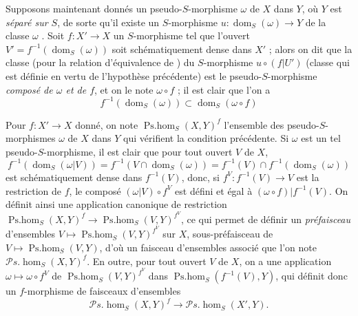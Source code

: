 \begin{env}[20.3.2]
Supposons maintenant donnés un pseudo-$S$-morphisme $\omega$ de $X$ dans $Y$, où $Y$ est \emph{séparé sur $S$}, de sorte qu'il existe un $S$-morphisme $u:\operatorname{dom}_S(\omega)\to Y$ de la classe $\omega$ .
Soit $f:X'\to X$ un $S$-morphisme tel que l'ouvert $V'=f^{-1}(\operatorname{dom}_S(\omega))$ soit schématiquement dense dans $X'$ ; alors on dit que la classe (pour la relation d'équivalence de ) du $S$-morphisme $u\circ(f|U')$ (classe qui est définie en vertu de l'hypothèse précédente) est le pseudo-$S$-morphisme \emph{composé de $\omega$ et de $f$}, et on le note $\omega\circ f$ ; il est clair que l'on a
\[
\label{IV.20.3.2.1}
  f^{-1}(\operatorname{dom}_S(\omega))\subset\operatorname{dom}_S(\omega\circ f)
  \tag{20.3.2.1}
\]

Pour $f:X'\to X$ donné, on note $\operatorname{Ps.hom}_S(X,Y)^f$ l'ensemble des pseudo-$S$-morphismes $\omega$ de $X$ dans $Y$ qui vérifient la condition précédente.
Si $\omega$ est un tel pseudo-$S$-morphisme, il est clair que pour tout ouvert $V$ de $X$,
\[
  f^{-1}(\operatorname{dom}_S(\omega|V))=f^{-1}(V\cap\operatorname{dom}_S(\omega))=f^{-1}(V)\cap f^{-1}(\operatorname{dom}_S(\omega))
\]
est schématiquement dense dans $f^{-1}(V)$, donc, si $f^V:f^{-1}(V)\to V$ est la restriction de $f$, le composé $(\omega|V)\circ f^V$ est défini et égal à $(\omega\circ f)|f^{-1}(V)$.
On définit ainsi une
application canonique de restriction $\operatorname{Ps.hom}_S(X,Y)^f\to\operatorname{Ps.hom}_S(V,Y)^{f^V}$, ce qui permet de définir un \emph{préfaisceau} d'ensembles $V\mapsto\operatorname{Ps.hom}_S(V,Y)^{f^V}$ sur $X$, sous-préfaisceau de $V\mapsto\operatorname{Ps.hom}_S(V,Y)$, d'où un faisceau d'ensembles associé que l'on note $\mathscr{P}\!s.\!\operatorname{hom}_S(X,Y)^f$.
En outre, pour tout ouvert $V$ de $X$, on a une application $\omega\mapsto\omega\circ f^V$ de $\operatorname{Ps.hom}_S(V,Y)^{f^V}$ dans $\operatorname{Ps.hom}_S(f^{-1}(V),Y)$, qui définit donc un $f$-morphisme de faisceaux d'ensembles
\[
  \mathscr{P}\!s.\!\operatorname{hom}_S(X,Y)^f\to\mathscr{P}\!s.\!\operatorname{hom}_S(X',Y).
\]
\end{env}

